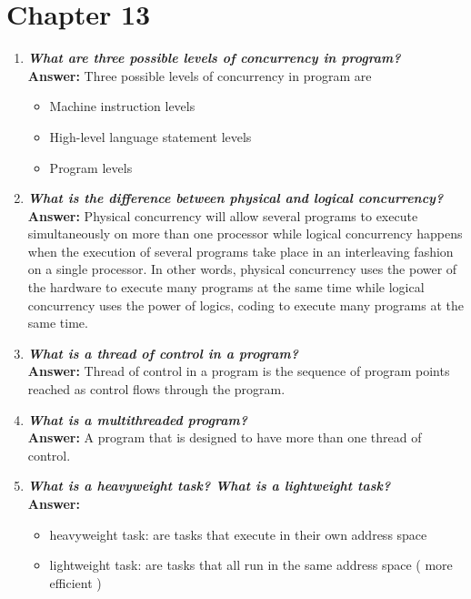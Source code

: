 \documentclass{article}
\begin{document}
\section{Chapter 13}
\begin{enumerate}[(1)]
\item
\textbf{\textit{What are three possible levels of concurrency in program?}}\\
\textbf{Answer: } Three possible levels of concurrency in program are\
	\begin{itemize}
	\item Machine instruction levels
	\item High-level language statement levels
	\item Program levels
	\end{itemize}

\item
\textbf{\textit{What is the difference between physical and logical concurrency? }}\\
\textbf{Answer:} Physical concurrency will allow several programs to execute simultaneously on more than one processor while logical concurrency happens when the execution of several programs take place in an interleaving fashion on a single processor. In other words, physical concurrency uses the power of the hardware to execute many programs at the same time while logical concurrency uses the power of logics, coding to execute many programs at the same time.

\item 
\textbf{\textit{What is a thread of control in a program?}}\\
\textbf{Answer: } Thread of control in a program is the sequence of program points reached as control flows through the program.

\item 
\textbf{\textit{What is a multithreaded program?}}\\
\textbf{Answer: } A program that is designed to have more than one thread of control.

\item
\textbf{\textit{What is a heavyweight task? What is a lightweight task?}}\\
\textbf{Answer: }
	\begin{itemize}
	\item heavyweight task: are tasks that execute in their own address space
	\item lightweight task: are tasks that all run in the same address space ( more efficient )
	\end{itemize}



\end{enumerate}
\end{document}
